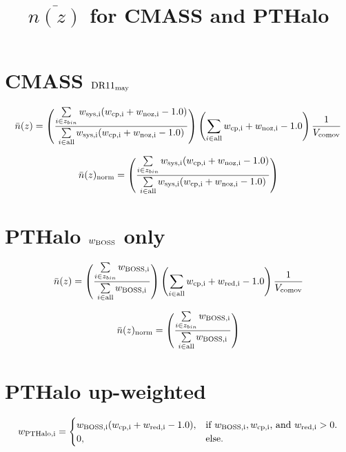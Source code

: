\documentclass[letterpaper]{article}
\begin{document}
\title{$\overline{n(z)}$ for CMASS and PTHalo}
\section{CMASS $\rm{DR11}_{\rm{may}}$}
\begin{equation}
\bar{n}(z) = \left(\frac{\sum\limits_{i \in z_{bin}} w_{\rm{sys},i}(w_{\rm{cp},i} + w_{\rm{noz},i} - 1.0) }{\sum\limits_{i \in \rm{all}} w_{\rm{sys},i}(w_{\rm{cp},i} + w_{\rm{noz},i} - 1.0) } \right) \left(\sum\limits_{i \in \rm{all}} w_{\rm{cp},i} + w_{\rm{noz},i}-1.0 \right) \frac{1}{V_{\rm{comov}}}
\end{equation}

\begin{equation}
\bar{n}(z)_{\rm{norm}} = \left(\frac{\sum\limits_{i \in z_{bin}} w_{\rm{sys},i}(w_{\rm{cp},i} + w_{\rm{noz},i} - 1.0) }{\sum\limits_{i \in \rm{all}} w_{\rm{sys},i}(w_{\rm{cp},i} + w_{\rm{noz},i} - 1.0) } \right) 
\end{equation}

\section{PTHalo $w_{\rm{BOSS}}$ only}
\begin{equation}
\bar{n}(z) = \left(\frac{\sum\limits_{i \in z_{bin}} w_{\rm{BOSS},i} }{\sum\limits_{i \in \rm{all}} w_{\rm{BOSS},i} } \right) \left(\sum\limits_{i \in \rm{all}} w_{\rm{cp},i} + w_{\rm{red},i}-1.0 \right) \frac{1}{V_{\rm{comov}}}
\end{equation}

\begin{equation}
\bar{n}(z)_{\rm{norm}} = \left(\frac{\sum\limits_{i \in z_{bin}} w_{\rm{BOSS},i} }{\sum\limits_{i \in \rm{all}} w_{\rm{BOSS},i} } \right)
\end{equation}

\section{PTHalo up-weighted}
\begin{equation}
w_{\rm{PTHalo},i} = \begin{cases}
    w_{\rm{BOSS},i}(w_{\rm{cp},i} + w_{\rm{red},i} - 1.0), & \text{if $w_{\rm{BOSS},i},w_{\rm{cp},i}$, and $w_{\rm{red},i} > 0$.} \\
    0, & \text{else.} 
    \end{cases}
\end{equation}
\end{document}
